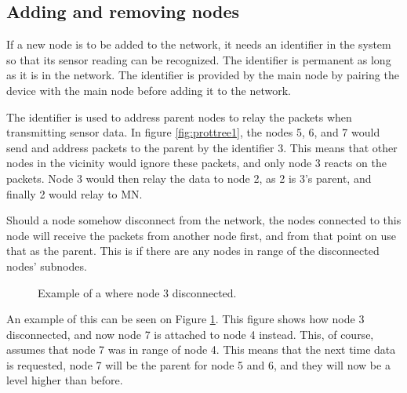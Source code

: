 \subsection*{Adding and removing nodes}
If a new node is to be added to the network, it needs an identifier in the system so that its sensor reading can be recognized. The identifier is permanent as long as it is in the network.
The identifier is provided by the main node by pairing the device with the main node before adding it to the network. 

The identifier is used to address parent nodes to relay the packets when transmitting sensor data. In figure \ref{fig:prottree1}, the nodes 5, 6, and 7 would send and address packets to the parent by the identifier 3. This means that other nodes in the vicinity would ignore these packets, and only node 3 reacts on the packets. Node 3 would then relay the data to node 2, as 2 is 3's parent, and finally 2 would relay to MN.

Should a node somehow disconnect from the network, the nodes connected to this node will receive the packets from another node first, and from that point on use that as the parent. This is if there are any nodes in range of the disconnected nodes' subnodes. 

\begin{figure}[!h]
	\centering
	\caption{Example of a where node 3 disconnected.}
	\label{fig:prottree2}
\end{figure}

An example of this can be seen on Figure \ref{fig:prottree2}. This figure shows how node 3 disconnected, and now node 7 is attached to node 4 instead. This, of course, assumes that node 7 was in range of node 4.
This means that the next time data is requested, node 7 will be the parent for node 5 and 6, and they will now be a level higher than before.